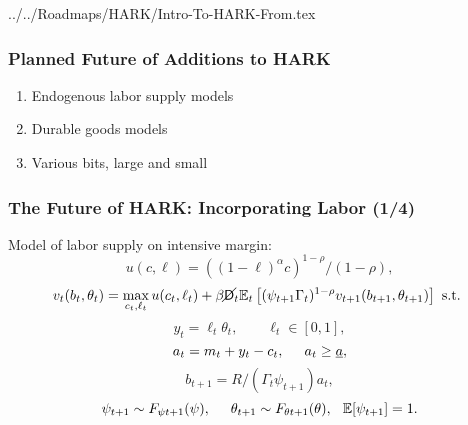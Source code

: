 \documentclass[public]{beamer}\beamerdefaultoverlayspecification{<+->}
\begin{document}
\begin{verbatimwrite}{../../Roadmaps/HARK/Intro-To-HARK-From.tex}
  \begin{frame}\label{HARKFuture}\frametitle{Planned Future of Additions to HARK}

    \begin{enumerate}
    \item Endogenous labor supply models  \hyperlink{LaborSupply}{}
    \item Durable goods models \hyperlink{DurableGoods}{}
    \item Various bits, large and small \hyperlink{StructuralChanges}{}
    \end{enumerate}
  \end{frame}


  \begin{frame}\label{LaborSupply}
    \frametitle{The Future of HARK: Incorporating Labor (1/4)}
    Model of labor supply on intensive margin:
    \begin{equation*}
      u(c,\ell) = ((1-\ell)^\alpha c)^{1-\rho}/(1-\rho),
    \end{equation*}
    \begin{equation*}
      v_t(b_t,\theta_t) = \max_{c_t, \ell_t} u(c_t,\ell_t) + \beta \cancel{\mathsf{D}}_t \mathbb{E}_t \left[(\psi_{t+1} \Gamma_t)^{1-\rho} v_{t+1}(b_{t+1},\theta_{t+1}) \right] \text{ s.t. }
    \end{equation*}
    \begin{equation*}
      y_t = \ell_t \theta_t, \qquad \ell_t \in [0,1],
    \end{equation*}
    \begin{equation*}
      a_t = m_t + y_t - c_t, \hspace{0.5cm} a_t \geq \underline{a},
    \end{equation*}
    \begin{equation*}
      b_{t+1} = R/(\Gamma_t \psi_{t+1}) a_t, 
    \end{equation*}
    \begin{equation*}
      \psi_{t+1} \sim F_{\psi t+1}(\psi), \hspace{0.5cm} \theta_{t+1} \sim F_{\theta t+1}(\theta), \hspace{0.25cm} \mathbb{E}[\psi_{t+1}] = 1.
    \end{equation*}
  \end{frame}



\end{verbatimwrite}
\end{document}
